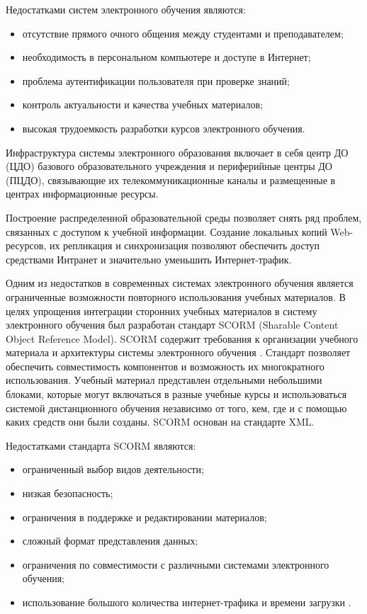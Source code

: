 Недостатками систем электронного обучения являются:

\begin{itemize}
\item отсутствие прямого очного общения между студентами и преподавателем;
\item необходимость в персональном компьютере и доступе в Интернет;
\item проблема аутентификации пользователя при проверке знаний;
\item контроль актуальности и качества учебных материалов; 
\item высокая трудоемкость разработки курсов электронного обучения. 
\end{itemize}

Инфраструктура системы электронного образования включает в себя центр ДО (ЦДО) базового образовательного учреждения и периферийные центры ДО (ПЦДО), связывающие их телекоммуникационные каналы и размещенные в центрах информационные ресурсы.

Построение распределенной образовательной среды позволяет снять ряд проблем, связанных с доступом к учебной информации. Создание локальных копий Web-ресурсов, их репликация и синхронизация позволяют обеспечить доступ средствами Интранет и значительно уменьшить Интернет-трафик.

Одним из недостатков в современных системах электронного обучения является ограниченные  возможности повторного использования учебных материалов. В целях упрощения интеграции сторонних учебных материалов в систему электронного обучения был разработан стандарт SCORM (Sharable Content Object Reference Model). SCORM содержит требования к организации учебного материала и архитектуры системы электронного обучения \cite{parmar2012paper} \cite{qu2002towards}. Стандарт позволяет обеспечить совместимость компонентов и возможность их многократного использования. Учебный материал представлен отдельными небольшими блоками, которые могут включаться в разные учебные курсы и использоваться системой дистанционного обучения независимо от того, кем, где и с помощью каких средств они были созданы. SCORM основан на стандарте XML.

Недостатками стандарта SCORM являются:

\begin{itemize}
\item ограниченный выбор видов деятельности;
\item низкая безопасность;
\item ограничения в поддержке и редактировании материалов;
\item сложный формат представления данных;
\item ограничения по совместимости с различными системами электронного обучения;
\item использование большого количества интернет-трафика и времени загрузки \cite{bohl2002sharable}.
\end{itemize}

